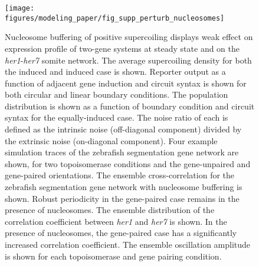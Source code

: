 \documentclass[11pt]{article}
\begin{document}
\begin{figure}[htbp]
    \centering
    {\texttt{[image: figures/modeling\_paper/fig\_supp\_perturb\_nucleosomes]}
    \label{fig:supp:nucleosome_sc_density}
    \label{fig:supp:nucleosome_induction_sweep}
    \label{fig:supp:nucleosome_joint_distribution}
    \label{fig:supp:nucleosome_zinani_examples}
    \label{fig:supp:nucleosome_zinani_crosscorr}
    \label{fig:supp:nucleosome_zinani_correlation_coefficient}
    \label{fig:supp:nucleosome_zinani_oscillation_amplitude}
    }
\end{figure}
\begin{figure}
    \ContinuedFloat
    \caption{Nucleosome buffering of positive supercoiling displays weak effect on expression profile of two-gene systems at steady state and on the \textit{her1}-\textit{her7} somite network.
         The average supercoiling density for both the induced and induced case is shown.
         Reporter output as a function of adjacent gene induction and circuit syntax is shown for both circular and linear boundary conditions.
         The population distribution is shown as a function of boundary condition and circuit syntax for the equally-induced case. The noise ratio of each is defined as the intrinsic noise (off-diagonal component) divided by the extrinsic noise (on-diagonal component).
         Four example simulation traces of the zebrafish segmentation gene network are shown, for two topoisomerase conditions and the gene-unpaired and gene-paired orientations.
         The ensemble cross-correlation for the zebrafish segmentation gene network with nucleosome buffering is shown. Robust periodicity in the gene-paired case remains in the presence of nucleosomes.
         The ensemble distribution of the correlation coefficient between \textit{her1} and \textit{her7} is shown. In the presence of nucleosomes, the gene-paired case has a significantly increased correlation coefficient.
         The ensemble oscillation amplitude is shown for each topoisomerase and gene pairing condition.
    }
    \label{fig:top:supp_perturb_nucleosomes}
\end{figure}
\end{document}
